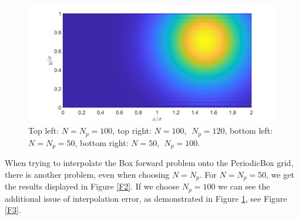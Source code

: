 \documentclass[11pt, a4paper]{article}
\theoremstyle{definition}
\begin{document}
\begin{figure}[h]
		\includegraphics[scale=0.15]{N50b.png}
		\caption{Top left: $N = N_p = 100$, top right: $N = 100,\ \ N_p = 120$, bottom left: $N = N_p = 50$, bottom right: $N = 50,\ \ N_p = 100$.} 
		\label{F1}
	\end{figure}
	When trying to interpolate the Box forward problem onto the PeriodicBox grid, there is another problem, even when choosing $N = N_p$. 
	For $N = N_p = 50$, we get the results displayed in Figure \ref{F2}. If we choose $N_p = 100$ we can see the additional issue of interpolation error, as demonstrated in Figure \ref{F1}, see Figure \ref{F3}.
\end{document}
